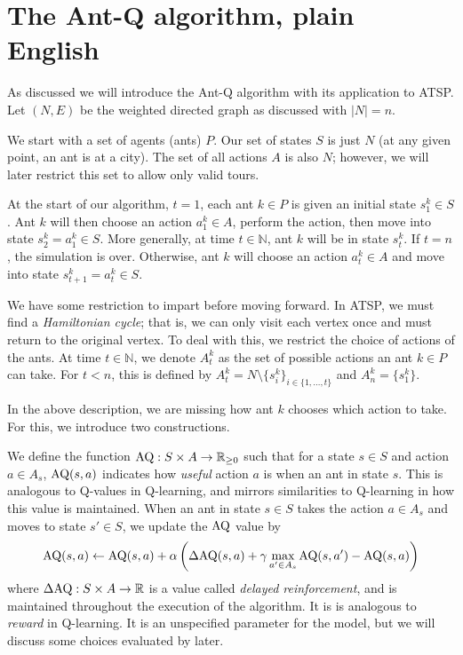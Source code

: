 \section{The Ant-Q algorithm, plain English}

As discussed we will introduce the Ant-Q algorithm with its application to ATSP. Let $(N,E)$ be the weighted directed graph as discussed with $\lvert N \rvert = n$. 

We start with a set of agents (ants) $P$. Our set of states $S$ is just $N$ (at any given point, an ant is at a city). The set of all actions $A$ is also $N$; however, we will later restrict this set to allow only valid tours.  

At the start of our algorithm, $t = 1$, each ant $k \in P$ is given an initial state $s_1^k \in S$. Ant $k$ will then choose an action $a_1^k \in A$, perform the action, then move into state $s_2^k = a_1^k \in S$. More generally, at time $t \in \mathbb N$, ant $k$ will be in state $s_t^k$. If $t = n$, the simulation is over. Otherwise, ant $k$ will choose an action $a_t^k \in A$ and move into state $s_{t+1}^k = a_t^k \in S$.

We have some restriction to impart before moving forward. In ATSP, we must find a \emph{Hamiltonian cycle}; that is, we can only visit each vertex once and must return to the original vertex. To deal with this, we restrict the choice of actions of the ants. At time $t \in \mathbb N$, we denote $A^k_t$ as the set of possible actions an ant $k \in P$ can take. For $t < n$, this is defined by $A^k_t = N \setminus \{ s^k_i \}_{i \in \{1, \ldots, t\}}$ and $A^k_n = \{s_1^k\}$.

In the above description, we are missing how ant $k$ chooses which action to take. For this, we introduce two constructions.

We define the function $\operatorname{AQ}: S \times A \to \mathbb R_{\geq 0}$ such that for a state $s \in S$ and action $a \in A_s$, $\operatorname{AQ}(s, a)$ indicates how \emph{useful} action $a$ is when an ant in state $s$. This is analogous to Q-values in Q-learning, and mirrors similarities to Q-learning in how this value is maintained. When an ant in state $s \in S$ takes the action $a \in A_s$ and moves to state $s' \in S$, we update the $\operatorname{AQ}$ value by
\begin{equation}
    \label{eq:aq-update}
    \operatorname{AQ}(s, a) \gets \operatorname{AQ}(s, a) + \alpha\left(
    \operatorname{\Delta AQ}(s,a) +
    \gamma \max_{a' \in A_{s}} \operatorname{AQ}(s, a') -
    \operatorname{AQ}(s, a)
    \right)
\end{equation}
where $\operatorname{\Delta AQ}: S \times A \to \mathbb R$ is a value called \emph{delayed reinforcement}, and is maintained throughout the execution of the algorithm. It is is analogous to \emph{reward} in Q-learning. It is an unspecified parameter for the model, but we will discuss some choices evaluated by \textcite{gambardella1995ant} later.

